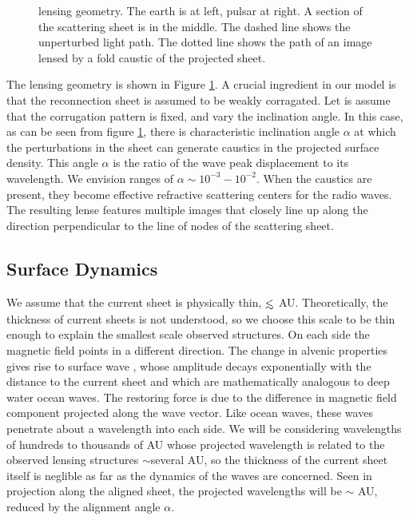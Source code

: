 \documentclass[useAMS,usenatbib]{mn2e}
\def\lesssim{\mathrel{\hbox{\rlap{\hbox{\lower4pt\hbox{$\sim$}}}\hbox{$<$}}}}
\begin{document}

\begin{figure}
\centerline{}
\vspace{-6in}
\caption{lensing geometry.  The earth is at left, pulsar at right.
A section of the scattering sheet is in the middle.  The dashed line 
shows the  unperturbed light path.  The dotted line shows the path of 
an image
lensed by a fold caustic of the projected sheet.}
\label{fig:sheetgeom}
\end{figure}

The lensing geometry is shown in Figure \ref{fig:sheetgeom}. A crucial ingredient in our model
is that the reconnection sheet is assumed to be weakly corragated. Let is assume that the corrugation
pattern is fixed, and vary the inclination angle. In this case, as can be seen from 
figure \ref{fig:sheetgeom},
there is characteristic inclination angle $\alpha$ at which the perturbations in the
sheet can generate caustics in the projected surface density.  This
angle $\alpha$ is the ratio of the wave peak displacement to its
wavelength.  We envision ranges of $\alpha \sim 10^{-3} - 10^{-2}$.
When the caustics are present, they
become effective refractive scattering centers for the radio waves. The resulting lense features
multiple images that closely line up along the direction perpendicular to the line of nodes of the
scattering sheet.


\subsection{Surface Dynamics}

We assume that the current sheet is physically thin, $\lesssim $ AU.  Theoretically,
the thickness of current sheets is not understood, so we choose this
scale to be thin enough to explain the smallest scale observed
structures.  On each side the
magnetic field points in a different direction.  The change in alvenic
properties gives rise to surface
wave \citep{1991SoPh..133..263J, 2009GApFD.103...89J}, whose amplitude
decays exponentially with the distance to the current sheet and which are
mathematically analogous to deep water ocean waves.  The restoring force is due to the
difference in magnetic field component projected along the wave
vector.  Like ocean waves, these waves penetrate about a wavelength
into each side.  We will be considering wavelengths of hundreds to thousands of
AU whose projected wavelength is related to the observed lensing
structures  $\sim$several AU, so the thickness of the current sheet itself is
neglible as far as the dynamics of 
the waves are concerned.  Seen in projection along the aligned sheet,
the projected wavelengths will be $\sim $ AU, reduced by the alignment
angle $\alpha$.
\end{document}
